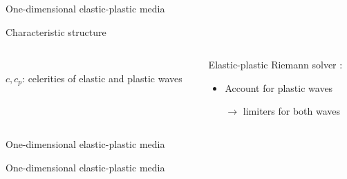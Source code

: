 \begin{frame}{One-dimensional elastic-plastic media}
\begin{block}{\footnotesize Characteristic structure \cite{Wang}}
\begin{columns}
\begin{column}{0.49\textwidth}
\begin{tikzpicture}[scale=0.6]
        \end{tikzpicture}\\
        \footnotesize $c,c_p$: celerities of elastic and plastic waves
      \end{column}
      \begin{column}{0.49\textwidth}
        \begin{block}{}
          \vspace{-0.95cm}
          \footnotesize Elastic-plastic Riemann solver \cite{Fogarty}:
          \begin{footnotesize}
            \begin{itemize}
            \item Account for \alert{plastic waves} 
            \item[$\rightarrow$] limiters for both waves
            \end{itemize}
          \end{footnotesize}
        \end{block}
      \end{column}
    \end{columns}
  \end{block}
  \vspace{-0.2cm}
\end{frame}

\begin{frame}{One-dimensional elastic-plastic media \cite{Thomas_EP}}
  \centering
\end{frame}


\begin{frame}{}
  \begin{block}{One-dimensional elastic-plastic media \cite{Thomas_EP}}
  \end{block}
  \begin{overprint}
    \centering
    

    \centering
    
    
    \centering
    
      
  \end{overprint}
  \vspace{-0.1cm}
\end{frame}



